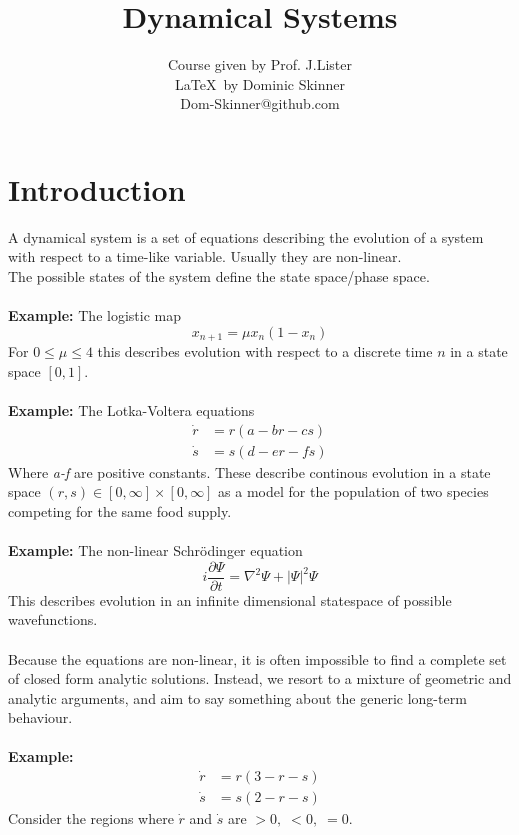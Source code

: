\documentclass{article}
\begin{document}
\title{Dynamical Systems}
\author{Course given by Prof. J.Lister \\
\LaTeX\  by Dominic Skinner \\
Dom-Skinner@github.com}
\maketitle
\section*{Introduction}
A dynamical system is a set of equations describing the evolution of a system
with respect to a time-like variable. Usually they are non-linear.
\\
The possible states of the system define the state space/phase space.
\\
\\
\textbf{Example:}   The logistic map
\[ x_{n+1} = \mu x_n ( 1- x_n) \]
For $ 0 \leq \mu \leq 4 $ this describes evolution with respect to a discrete time 
$n$ in a state space $[0,1]$.
\\
\\
\textbf{Example:}   The Lotka-Voltera equations
\begin{align*}
\dot{r} &= r(a - br -cs) \\
\dot{s} &= s(d - er -fs)
\end{align*}
Where \emph{a-f} are positive constants. These describe continous evolution 
in a state space $(r,s) \in [0 , \infty] \times [0, \infty]$ as a model for 
the population of two species competing for the same food supply.
\\
\\
\textbf{Example:}   The non-linear Schr\"odinger equation
\[ i \frac{\partial \Psi}{ \partial t} = \nabla^2 \Psi + |\Psi|^2 \Psi \]
This describes evolution in an infinite dimensional statespace of possible
wavefunctions.
\\
\\
Because the equations are non-linear, it is often impossible to find a complete
set of closed form analytic solutions. Instead, we resort to a mixture of 
geometric and analytic arguments, and aim to say something about the generic
long-term behaviour.
\\
\\
\textbf{Example:}   
\begin{align*}
\dot{r} &= r(3 - r -s) \\
\dot{s} &= s(2 - r -s)
\end{align*}
Consider the regions where $\dot{r}$ and $\dot{s}$ are $>0, \; <0, \; =0$. 
\end{document}
